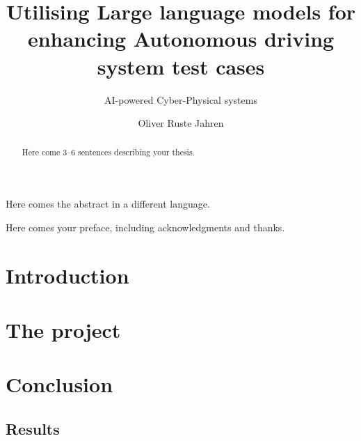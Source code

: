 \documentclass[UKenglish]{uiomasterthesis}  %
\title{Utilising Large language models for enhancing Autonomous driving system test cases }
\subtitle{AI-powered Cyber-Physical systems}         %
\author{Oliver Ruste Jahren}                      %
\begin{document}

\frontmatter{}
\begin{abstract}
  Here come 3--6 sentences describing your thesis.
\end{abstract}

\begin{xabstract}[Sammendrag]               %
  Here comes the abstract in a different language.
\end{xabstract}

\tableofcontents{}                          %
\listoffigures{}                            %
\listoftables{}                             %

\begin{preface}
  Here comes your preface, including acknowledgments and thanks.
\end{preface}

\mainmatter{}
\part{Introduction}                   %



\part{The project}                    %




\part{Conclusion}                     %
\chapter{Results}                     %

\backmatter{}
\printbibliography{}
\end{document}
